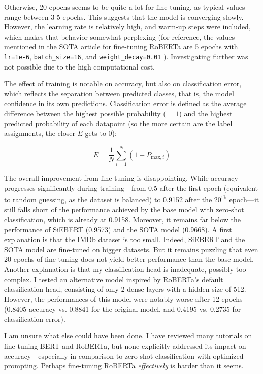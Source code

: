 \documentclass{article}
\begin{document}
Otherwise, 20 epochs seems to be quite a lot for fine-tuning, as typical values range between 3-5 epochs. This suggests that the model is converging slowly. However, the learning rate is relatively high, and warm-up steps were included, which makes that behavior somewhat perplexing (for reference, the values mentioned in the SOTA article for fine-tuning RoBERTa are 5 epochs with \texttt{lr=1e-6},  \texttt{batch\_size=16}, and \texttt{weight\_decay=0.01} \citep{csanady_llambert_2024}). Investigating further was not possible due to the high computational cost.

The effect of training is notable on accuracy, but also on classification error, which reflects the separation between predicted classes, that is, the model confidence in its own predictions. Classification error is defined as the average difference between the highest possible probability (\( =1 \)) and the highest predicted probability of each datapoint (so the more certain are the label assignments, the closer \( E \) gets to 0):

\[
E = \frac{1}{N} \sum_{i=1}^{N} (1 - P_{\text{max},i})
\]

The overall improvement from fine-tuning is disappointing. While accuracy progresses significantly during training—from 0.5 after the first epoch (equivalent to random guessing, as the dataset is balanced) to 0.9152 after the 20\textsuperscript{th} epoch—it still falls short of the performance achieved by the base model with zero-shot classification, which is already at 0.9158. Moreover, it remains far below the performance of SiEBERT (0.9573) and the SOTA model (0.9668). A first explanation is that the IMDb dataset is too small. Indeed, SiEBERT and the SOTA model are fine-tuned on bigger datasets. But it remains puzzling that even 20 epochs of fine-tuning does not yield better performance than the base model. Another explanation is that my classification head is inadequate, possibly too complex. I tested an alternative model inspired by RoBERTa’s default classification head, consisting of only 2 dense layers with a hidden size of 512. However, the performances of this model were notably worse after 12 epochs (0.8405 accuracy vs. 0.8841 for the original model, and 0.4195 vs. 0.2735 for classification error).

I am unsure what else could have been done. I have reviewed many tutorials on fine-tuning BERT and RoBERTa, but none explicitly addressed its impact on accuracy---especially in comparison to zero-shot classification with optimized prompting. Perhaps fine-tuning RoBERTa \textit{effectively} is harder than it seems.
\end{document}
